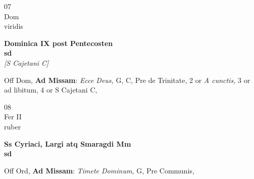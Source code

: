\documentclass[10pt, openany]{book}
\begin{document}
        \begin{center}
            \begin{minipage}{3.5in}
                \vspace{2em}
                \begin{minipage}{0.5in}
                    {\Huge 07} \\
                    {\normalsize Dom} \\
                    {\normalsize viridis}
                \end{minipage}
                \begin{minipage}{3.0in}
                    \textbf{ \large Dominica IX post Pentecosten \\
                    \textnormal{\normalsize sd}} \\ \textit{[S Cajetani C]} \\ 
                \end{minipage}
                \begin{justify}Off Dom, \textbf{Ad Missam}: \textit{Ecce Deus,} G, C, Pre de Trinitate, 2 or \textit{A cunctis,} 3 or ad libitum, 4 or S Cajetani C,   
                \end{justify}
            \end{minipage}
        \end{center}
    
        \begin{center}
            \begin{minipage}{3.5in}
                \vspace{2em}
                \begin{minipage}{0.5in}
                    {\Huge 08} \\
                    {\normalsize Fer II} \\
                    {\normalsize ruber}
                \end{minipage}
                \begin{minipage}{3.0in}
                    \textbf{ \large Ss Cyriaci, Largi atq Smaragdi Mm \\
                    \textnormal{\normalsize sd}} \\ 
                \end{minipage}
                \begin{justify}Off Ord, \textbf{Ad Missam}: \textit{Timete Dominum,} G, Pre Communis,   
                \end{justify}
            \end{minipage}
        \end{center}
    
\end{document}
